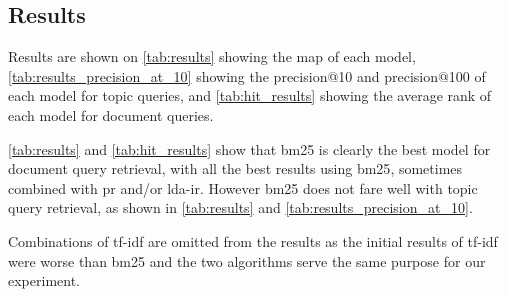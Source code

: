 \subsection{Results}\label{subsec:results}

Results are shown on \autoref{tab:results} showing the \gls{map} of each model, \autoref{tab:results_precision_at_10} showing the precision@10 and precision@100 of each model for topic queries, and \autoref{tab:hit_results} showing the average rank of each model for document queries.


\autoref{tab:results} and \autoref{tab:hit_results} show that \gls{bm25} is clearly the best model for document query retrieval, with all the best results using \gls{bm25}, sometimes combined with \gls{pr} and/or \gls{lda}-\gls{ir}. 
However \gls{bm25} does not fare well with topic query retrieval, as shown in \autoref{tab:results} and \autoref{tab:results_precision_at_10}.

Combinations of \gls{tf-idf} are omitted from the results as the initial results of \gls{tf-idf} were worse than \gls{bm25} and the two algorithms serve the same purpose for our experiment.


